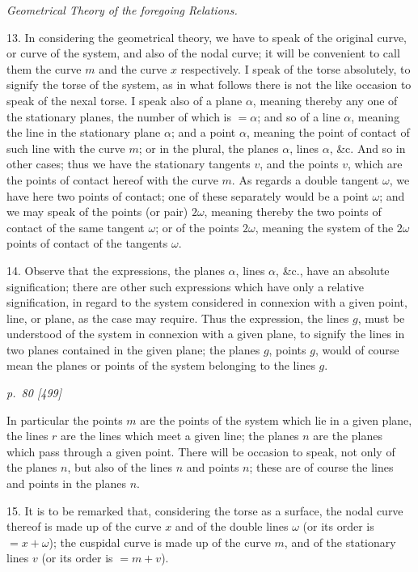 \documentclass[11pt,a4paper]{article}
\newcommand{\pagemarker}[2]{\clearpage\noindent\textit{p.~#1 [#2]}\par\medskip}
\begin{document}
\begin{center}\textit{Geometrical Theory of the foregoing Relations.}\end{center}

13. In considering the geometrical theory, we have to speak of the original curve,
or curve of the system, and also of the nodal curve; it will be convenient to call them
the curve \(m\) and the curve \(x\) respectively. I speak of the torse absolutely, to
signify the torse of the system, as in what follows there is not the like occasion to
speak of the nexal torse. I speak also of a plane \(\alpha\), meaning thereby any one
of the stationary planes, the number of which is \(=\alpha\); and so of a line
\(\alpha\), meaning the line in the stationary plane \(\alpha\); and a point \(\alpha\),
meaning the point of contact of such line with the curve \(m\); or in the plural, the
planes \(\alpha\), lines \(\alpha\), \&c. And so in other cases; thus we have the
stationary tangents \(v\), and the points \(v\), which are the points of contact hereof
with the curve \(m\). As regards a double tangent \(\omega\), we have here two points
of contact; one of these separately would be a point \(\omega\); and we may speak of
the points (or pair) \(2\omega\), meaning thereby the two points of contact of the same
tangent \(\omega\); or of the points \(2\omega\), meaning the system of the \(2\omega\)
points of contact of the tangents \(\omega\).

14. Observe that the expressions, the planes \(\alpha\), lines \(\alpha\), \&c., have an
absolute signification; there are other such expressions which have only a relative
signification, in regard to the system considered in connexion with a given point,
line, or plane, as the case may require. Thus the expression, the lines \(g\), must
be understood of the system in connexion with a given plane, to signify the lines in
two planes contained in the given plane; the planes \(g\), points \(g\), would of course
mean the planes or points of the system belonging to the lines \(g\).

\pagemarker{80}{499}
In particular the points \(m\) are the points of the system which lie in a given plane,
the lines \(r\) are the lines which meet a given line; the planes \(n\) are the planes
which pass through a given point. There will be occasion to speak, not only of the
planes \(n\), but also of the lines \(n\) and points \(n\); these are of course the lines
and points in the planes \(n\).

15. It is to be remarked that, considering the torse as a surface, the nodal curve
thereof is made up of the curve \(x\) and of the double lines \(\omega\) (or its order is
\(=x+\omega\)); the cuspidal curve is made up of the curve \(m\), and of the stationary
lines \(v\) (or its order is \(=m+v\)).
\end{document}
